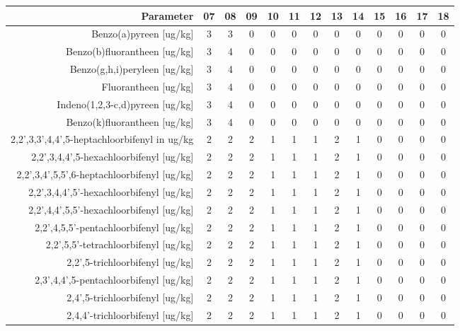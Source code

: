 \begin{tabular}{ r |c | c | c | c | c |c | c | c | c | c | c | c } 
\rowcolor[HTML]{EFEFEF}  
 Parameter & 07 & 08 & 09 & 10 & 11 & 12 & 13 & 14 & 15 & 16 & 17 & 18 \\    \hline     
Benzo(a)pyreen [ug/kg] &3 & 3 & 0 & 0 & 0 & 0 & 0 & 0 & 0 & 0 & 0 & 0 \\
Benzo(b)fluorantheen [ug/kg] &3 & 4 & 0 & 0 & 0 & 0 & 0 & 0 & 0 & 0 & 0 & 0 \\
Benzo(g,h,i)peryleen [ug/kg] &3 & 4 & 0 & 0 & 0 & 0 & 0 & 0 & 0 & 0 & 0 & 0 \\
Fluorantheen [ug/kg] &3 & 4 & 0 & 0 & 0 & 0 & 0 & 0 & 0 & 0 & 0 & 0 \\
Indeno(1,2,3-c,d)pyreen [ug/kg] &3 & 4 & 0 & 0 & 0 & 0 & 0 & 0 & 0 & 0 & 0 & 0 \\
Benzo(k)fluorantheen [ug/kg] &3 & 4 & 0 & 0 & 0 & 0 & 0 & 0 & 0 & 0 & 0 & 0 \\
2,2',3,3',4,4',5-heptachloorbifenyl in ug/kg &2 & 2 & 2 & 1 & 1 & 1 & 2 & 1 & 0 & 0 & 0 & 0 \\
2,2',3,4,4',5-hexachloorbifenyl [ug/kg] &2 & 2 & 2 & 1 & 1 & 1 & 2 & 1 & 0 & 0 & 0 & 0 \\
2,2',3,4',5,5',6-heptachloorbifenyl [ug/kg] &2 & 2 & 2 & 1 & 1 & 1 & 2 & 1 & 0 & 0 & 0 & 0 \\
2,2',3,4,4',5'-hexachloorbifenyl [ug/kg] &2 & 2 & 2 & 1 & 1 & 1 & 2 & 1 & 0 & 0 & 0 & 0 \\
2,2',4,4',5,5'-hexachloorbifenyl [ug/kg] &2 & 2 & 2 & 1 & 1 & 1 & 2 & 1 & 0 & 0 & 0 & 0 \\
2,2',4,5,5'-pentachloorbifenyl [ug/kg] &2 & 2 & 2 & 1 & 1 & 1 & 2 & 1 & 0 & 0 & 0 & 0 \\
2,2',5,5'-tetrachloorbifenyl [ug/kg] &2 & 2 & 2 & 1 & 1 & 1 & 2 & 1 & 0 & 0 & 0 & 0 \\
2,2',5-trichloorbifenyl [ug/kg] &2 & 2 & 2 & 1 & 1 & 1 & 2 & 1 & 0 & 0 & 0 & 0 \\
2,3',4,4',5-pentachloorbifenyl [ug/kg] &2 & 2 & 2 & 1 & 1 & 1 & 2 & 1 & 0 & 0 & 0 & 0 \\
2,4',5-trichloorbifenyl [ug/kg] &2 & 2 & 2 & 1 & 1 & 1 & 2 & 1 & 0 & 0 & 0 & 0 \\
2,4,4'-trichloorbifenyl [ug/kg] &2 & 2 & 2 & 1 & 1 & 1 & 2 & 1 & 0 & 0 & 0 & 0 \\
\end{tabular}    
